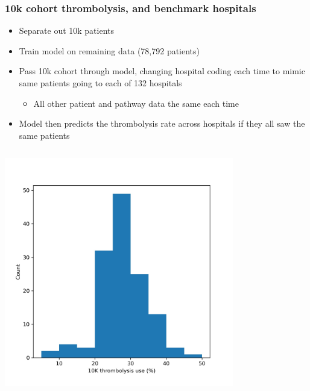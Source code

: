 \documentclass[xcolor={usenames,dvipsnames}]{beamer}
\begin{document}

\begin{frame}
\frametitle{10k cohort thrombolysis, and benchmark hospitals}

\begin{itemize}
  \footnotesize
  \item Separate out 10k patients 
  \item Train model on remaining data (78,792 patients)
  \item Pass 10k cohort through model, changing hospital coding each time to mimic same patients going to each of 132 hospitals
  \begin{itemize} 
    \footnotesize
    \item All other patient and pathway data the same each time
  \end{itemize} 
  \item Model then predicts the thrombolysis rate across hospitals if they all saw the same patients
\end{itemize}

\begin{columns} 
    \begin{center} 
    \includegraphics[width=0.75\textwidth, trim={0em 0em 0em 4em}, clip]{./images/predicted_thrombolysis_use}
    \end{center} 
        

\end{columns}
\end{frame}
\end{document}
